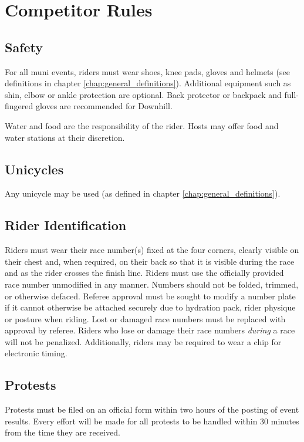 \chapter{Competitor Rules}

\section{Safety}
For all muni events, riders must wear shoes, knee pads, gloves and helmets (see definitions in chapter \ref{chap:general_definitions}).
Additional equipment such as shin, elbow or ankle protection are optional.
Back protector or backpack and full-fingered gloves are recommended for Downhill.

Water and food are the responsibility of the rider.
Hosts may offer food and water stations at their discretion.

\section{Unicycles}

Any unicycle may be used (as defined in chapter \ref{chap:general_definitions}).

\section{Rider Identification}

Riders must wear their race number(s) fixed at the four corners, clearly visible on their chest and, when required, on their back so that it is visible during the race and as the rider crosses the finish line.
Riders must use the officially provided race number unmodified in any manner.
Numbers should not be folded, trimmed, or otherwise defaced.
Referee approval must be sought to modify a number plate if it cannot otherwise be attached securely due to hydration pack, rider physique or posture when riding.
Lost or damaged race numbers must be replaced with approval by referee.
Riders who lose or damage their race numbers \textit{during} a race will not be penalized.
Additionally, riders may be required to wear a chip for electronic timing.

\section{Protests}

Protests must be filed on an official form within two hours of the posting of event results.
Every effort will be made for all protests to be handled within 30 minutes from the time they are received.

